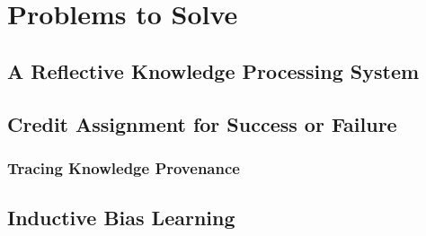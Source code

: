 \chapter{Problems to Solve}\label{ch:problems_to_solve}

\section{A Reflective Knowledge Processing System}



\section{Credit Assignment for Success or Failure}

\subsection{Tracing Knowledge Provenance}

\section{Inductive Bias Learning}

